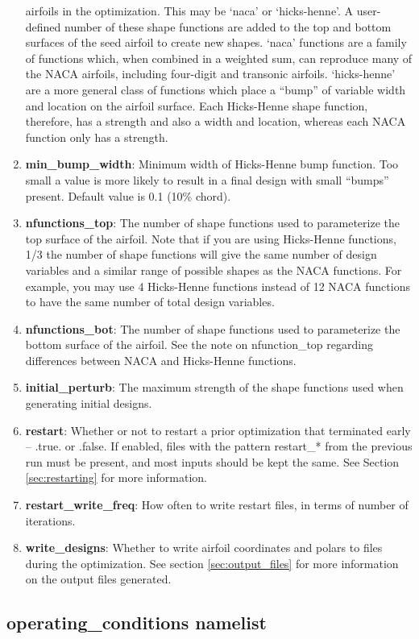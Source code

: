 \documentclass[11pt]{article}
\begin{document}
\begin{enumerate}
{airfoils in the optimization.  This may be `naca' or `hicks-henne'.  A user-defined number
of these shape functions are added to the top and bottom surfaces of the seed airfoil to
create new shapes.  `naca' functions are a family of functions which, when combined in a
weighted sum, can reproduce many of the NACA airfoils, including four-digit and transonic
airfoils.  `hicks-henne' are a more general class of functions which place a ``bump'' of
variable width and location on the airfoil surface.  Each Hicks-Henne shape function,
therefore, has a strength and also a width and location, whereas each NACA function only
has a strength.}
\item{\textbf{min\_bump\_width}: Minimum width of Hicks-Henne bump function.  Too small a
value is more likely to result in a final design with small ``bumps'' present.  Default
value is 0.1 (10\% chord).}
\item{\textbf{nfunctions\_top}: The number of shape functions used to parameterize the top
surface of the airfoil.  Note that if you are using Hicks-Henne functions, 1/3 the
number of shape functions will give the same number of design variables and a similar range of
possible shapes as the NACA functions.  For example, you may use 4 Hicks-Henne functions
instead of 12 NACA functions to have the same number of total design variables.}
\item{\textbf{nfunctions\_bot}: The number of shape functions used to parameterize the
bottom surface of the airfoil.  See the note on nfunction\_top regarding differences
between NACA and Hicks-Henne functions.}
\item{\textbf{initial\_perturb}: The maximum strength of the shape functions used when
generating initial designs.}
\item{\textbf{restart}: Whether or not to restart a prior optimization that terminated
early -- .true. or .false.  If enabled, files with the pattern restart\_* from the 
previous run must be present, and most inputs should be kept the same. See Section 
\ref{sec:restarting} for more information.}
\item{\textbf{restart\_write\_freq}: How often to write restart files, in terms of number
of iterations.}
\item{\textbf{write\_designs}: Whether to write airfoil coordinates and polars to files
during the optimization.  See section \ref{sec:output_files} for more information on the
output files generated.}
\end{enumerate}

\subsection{operating\_conditions namelist}
\end{document}
